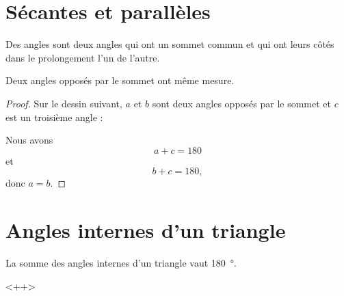 

\section{Sécantes et parallèles}



\begin{definition}
    Des angles  sont deux angles qui ont un sommet commun et qui ont leurs côtés dans le prolongement l'un de l'autre.
\end{definition}

\begin{propriete}
    Deux angles opposés par le sommet ont même mesure.
\end{propriete}

\begin{proof}
    Sur le dessin suivant, \( a\) et \(b\) sont deux angles opposés par le sommet et \( c\) est un troisième angle :

\begin{center}
    
\end{center}

Nous avons
\begin{equation}
    a+c=180
\end{equation}
et
\begin{equation}
    b+c=180,
\end{equation}
donc \( a=b\).

\end{proof}


\section{Angles internes d'un triangle}



\begin{theorem}
    La somme des angles internes d'un triangle vaut \SI{180}{\degree}.
\end{theorem}
<++>

